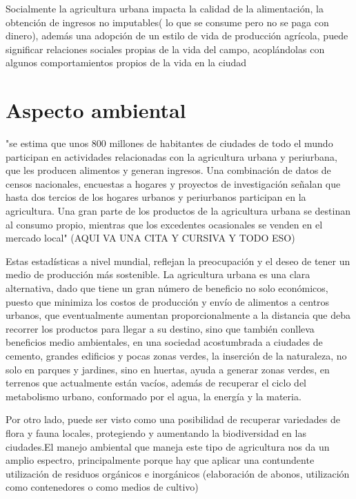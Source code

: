 Socialmente la agricultura urbana impacta la calidad de la alimentación, la obtención de ingresos no imputables( lo que se consume pero no se paga con dinero), además una adopción de un estilo de vida de producción agrícola, puede significar relaciones sociales propias de la vida del campo, acoplándolas con algunos comportamientos propios de la vida en la ciudad   

\section{Aspecto ambiental}
"se estima que unos 800 millones de habitantes de ciudades de todo el mundo participan en actividades relacionadas con la agricultura urbana y periurbana, que les producen alimentos y generan ingresos. Una combinación de datos de censos nacionales, encuestas a hogares y proyectos de investigación señalan que hasta dos tercios de los hogares urbanos y periurbanos participan en la agricultura. Una gran parte de los productos de la agricultura urbana se destinan al consumo propio, mientras que los excedentes ocasionales se venden en el mercado local" (AQUI VA UNA CITA Y CURSIVA Y TODO ESO)

Estas estadísticas a nivel mundial, reflejan la preocupación y el deseo de tener un medio de producción más sostenible. La agricultura urbana es una clara alternativa, dado que tiene un gran número de beneficio no solo económicos, puesto que minimiza los costos de producción y envío de alimentos a centros urbanos, que eventualmente aumentan proporcionalmente a la distancia que deba recorrer los productos para llegar a su destino, sino que también conlleva beneficios medio ambientales, en una sociedad acostumbrada a ciudades de cemento, grandes edificios y pocas zonas verdes, la inserción de la naturaleza, no solo en parques y jardines, sino en huertas, ayuda a generar zonas verdes, en terrenos que actualmente están vacíos, además de recuperar el ciclo del metabolismo urbano, conformado por el agua, la energía y la materia.

Por otro lado, puede ser visto como una posibilidad de recuperar variedades de flora y fauna locales, protegiendo y aumentando la biodiversidad en las ciudades.El manejo ambiental que maneja este tipo de agricultura nos da un amplio espectro, principalmente porque hay que aplicar una contundente utilización de residuos orgánicos e inorgánicos (elaboración de abonos, utilización como contenedores o como medios de cultivo)

